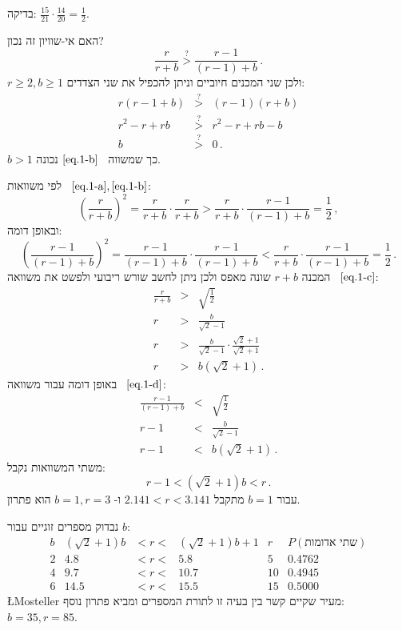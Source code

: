 בדיקה:
$\frac{15}{21}\cdot\frac{14}{20}=\frac{1}{2}$.


האם אי-שוויון זה נכון?
\begin{equation}\label{eq.1-b}
\frac{r}{r+b} \stackrel{?}{>} \frac{r-1}{(r-1)+b}\,.
\end{equation}
$r\geq 2, b\geq 1$
ולכן שני המכנים חיוביים וניתן להכפיל את שני הצדדים:
\begin{eqnarray*}
r(r-1+b)&\stackrel{?}{>}&(r-1)(r+b)\\
r^2-r+rb&\stackrel{?}{>}&r^2-r+rb-b\\
b&\stackrel{?}{>}&0\,.
\end{eqnarray*}
$b>1$
כך שמשווה%
~$\ref{eq.1-b}$
נכונה.

לפי משוואות%
~$\ref{eq.1-a}, \ref{eq.1-b}$:
\begin{equation}\label{eq.1-c}
\left(\frac{r}{r+b}\right)^2 = \frac{r}{r+b} \cdot\frac{r}{r+b} > \frac{r}{r+b} \cdot \frac{r-1}{(r-1)+b} = \frac{1}{2}\,,
\end{equation}
ובאופן דומה:
\begin{equation}\label{eq.1-d}
\left(\frac{r-1}{(r-1)+b}\right)^2  = \frac{r-1}{(r-1)+b}\cdot \frac{r-1}{(r-1)+b}<  \frac{r}{r+b} \cdot \frac{r-1}{(r-1)+b} = \frac{1}{2}\,.
\end{equation}
המכנה
$r+b$
שונה מאפס ולכן ניתן לחשב שורש ריבועי ולפשט את משוואה%
~$\ref{eq.1-c}$:
\begin{eqnarray*}
\frac{r}{r+b}  &>& \sqrt{\frac{1}{2}}\\
r&>&\frac{b}{\sqrt{2}-1}\\
r&>&\frac{b}{\sqrt{2}-1}\cdot\frac{\sqrt{2}+1}{\sqrt{2}+1}\\
r&>&b(\sqrt{2}+1)\,.
\end{eqnarray*}
באופן דומה עבור משוואה%
~$\ref{eq.1-d}$:
\begin{eqnarray*}
\frac{r-1}{(r-1)+b}&<&\sqrt{\frac{1}{2}}\\
r-1 &<& \frac{b}{\sqrt{2}-1}\\
r-1&<&b(\sqrt{2}+1)\,.
\end{eqnarray*}
משתי המשוואות נקבל:
\begin{equation}\label{eq.inequalities}
r-1<(\sqrt{2}+1)b<r\,.
\end{equation}
עבור 
$b=1$
מתקבל
$2.141 < r< 3.141$
ו-%
$b=1,r=3$
הוא פתרון.

נבדוק מספרים זוגיים עבור
$b$:
\begin{displaymath}	
\renewcommand{\arraystretch}{1}
\begin{array}{r|ccc|c|c}
b& (\sqrt{2}+1)b&<r<& (\sqrt{2}+1)b+1&r&P(\textrm{שתי אדומות})\\
\hline
2&4.8&<r<&5.8&5&0.4762\\
4&9.7&<r<&10.7&10&0.4945\\
6&14.5&<r<&15.5&
15&0.5000
\end{array}
\end{displaymath}
\L{Mosteller}
מעיר שקיים קשר בין בעיה זו לתורת המספרים ומביא פתרון נוסף:
$b=35,r=85$.


